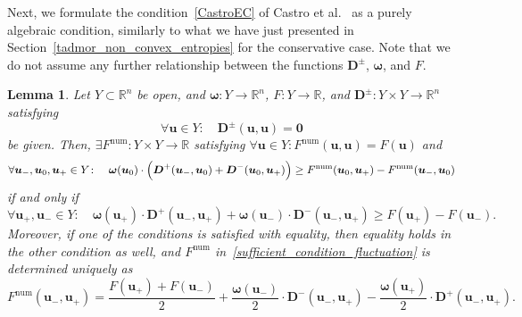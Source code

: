 \documentclass[]{scrartcl}
\renewcommand{\vec}[1]{\boldsymbol{#1}}
\newtheorem{lemma}[theorem]{Lemma}
\theoremstyle{definition}
\begin{document}
Next, we formulate the condition~\eqref{CastroEC} of Castro et al.\ \cite{Castro2013} as a purely algebraic condition, similarly to what we have just presented in Section~\ref{tadmor_non_convex_entropies} for the conservative case.
Note that we do not assume any further relationship between the functions $\vec{D}^\pm$, $\vec{\omega}$, and $F$.
\begin{lemma}{\label{algebraic_lemma_fluctuation}}
    Let $Y \subset \mathbb{R}^n$ be open, and $\vec{\omega}\colon Y \to \mathbb{R}^n$, $F\colon Y \to \mathbb{R}$, and $\vec{D}^{\pm}\colon Y \times Y \to \mathbb{R}^n$ satisfying
    \begin{equation}
    \forall \vec{u} \in Y\colon \quad \vec{D}^{\pm}(\vec{u},\vec{u}) = \vec{0}
    \end{equation}
    be given. Then,
    $\exists F^\mathrm{num}\colon Y \times Y \to \mathbb{R}$ satisfying $\forall \vec{u} \in Y\colon F^\mathrm{num}(\vec{u},\vec{u}) = F(\vec{u})$ and
    \begin{equation}
    \forall \vec{u}_-, \vec{u}_0, \vec{u}_+ \in Y\colon \quad \vec{\omega}(\vec{u}_0) \cdot \Bigl ( \vec{D}^+(\vec{u}_-, \vec{u}_0) + \vec{D}^{-}(\vec{u}_0, \vec{u}_+) \Bigr ) \geq F^\mathrm{num}(\vec{u}_0, \vec{u}_+) - F^\mathrm{num}(\vec{u}_-, \vec{u}_0)
    \label{sufficient_condition_fluctuation}
    \end{equation}
    if and only if
    \begin{equation}
    \forall \vec{u}_+, \vec{u}_- \in Y\colon \quad \vec{\omega}(\vec{u}_+) \cdot \vec{D}^+(\vec{u}_-, \vec{u}_+) + \vec{\omega}(\vec{u}_-) \cdot \vec{D}^-(\vec{u}_-, \vec{u}_+) \geq  F(\vec{u}_+) - F(\vec{u}_-).
    \label{necessary_condition_fluctuation}
    \end{equation}
    Moreover, if one of the conditions is satisfied with equality, then equality holds in the other condition as well, and $F^\mathrm{num}$ in~\eqref{sufficient_condition_fluctuation} is determined uniquely as
    \begin{equation}
    F^{\mathrm{num}}(\vec{u}_-, \vec{u}_+) = \frac{F(\vec{u}_+) + F(\vec{u}_-)}{2} + \frac{\vec{\omega}(\vec{u}_-)}{2} \cdot \vec{D}^-(\vec{u}_-, \vec{u}_+) - \frac{\vec{\omega}(\vec{u}_+)}{2} \cdot \vec{D}^+(\vec{u}_-,\vec{u}_+).
    \label{F_num_fluctuation}
    \end{equation}
\end{lemma}
\end{document}
